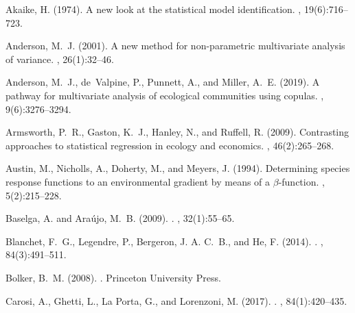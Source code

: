 \documentclass[a4paper,11pt]{article}
\begin{document}
\begin{thebibliography}{}

Akaike, H. (1974).
\newblock A new look at the statistical model identification.
, 19(6):716--723.

Anderson, M.~J. (2001).
\newblock A new method for non-parametric multivariate analysis of variance.
, 26(1):32--46.

Anderson, M.~J., de~Valpine, P., Punnett, A., and Miller, A.~E. (2019).
\newblock A pathway for multivariate analysis of ecological communities using
  copulas.
, 9(6):3276--3294.

Armsworth, P.~R., Gaston, K.~J., Hanley, N., and Ruffell, R. (2009).
\newblock Contrasting approaches to statistical regression in ecology and
  economics.
, 46(2):265--268.

Austin, M., Nicholls, A., Doherty, M., and Meyers, J. (1994).
\newblock Determining species response functions to an environmental gradient
  by means of a $\beta$-function.
, 5(2):215--228.

Baselga, A. and Ara{\'{u}}jo, M.~B. (2009).
.
, 32(1):55--65.

Blanchet, F.~G., Legendre, P., Bergeron, J. A. C.~B., and He, F. (2014).
.
, 84(3):491--511.

Bolker, B.~M. (2008).
.
\newblock Princeton University Press.

Carosi, A., Ghetti, L., {La Porta}, G., and Lorenzoni, M. (2017).
.
, 84(1):420--435.


\end{thebibliography}
\end{document}
